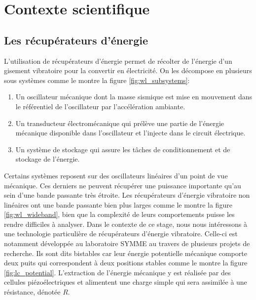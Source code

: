 \documentclass[a4paper, french, 12pt, titlepage]{article}
\begin{document}
\newpage

\section{Contexte scientifique}


\subsection{Les récupérateurs d'énergie}





L'utilisation de récupérateurs d'énergie permet de récolter de l'énergie d'un gisement vibratoire pour la convertir en électricité.
On les décompose en plusieurs sous systèmes comme le montre la figure \ref{fig:wl_subsystems}:
\begin{enumerate}
  \item Un oscillateur mécanique dont la masse sismique est mise en mouvement dans le référentiel de l'oscillateur par l'accélération ambiante.
  \item Un transducteur électromécanique qui prélève une partie de l'énergie mécanique disponible dans l'oscillateur et l'injecte dans le circuit électrique.
  \item Un système de stockage qui assure les tâches de conditionnement et de stockage de l'énergie.
\end{enumerate}

Certains systèmes reposent sur des oscillateurs linéaires d'un point de vue mécanique.
Ces derniers ne peuvent récupérer une puissance importante qu'au sein d'une bande passante très étroite.
Les récupérateurs d'énergie vibratoire non linéaires ont une bande passante bien plus larges comme le montre la figure \ref{fig:wl_wideband}, bien que la complexité de leurs comportements puisse les rendre difficiles à analyser.
Dans le contexte de ce stage, nous nous intéressons à une technologie particulière de récupérateurs d'énergie vibratoire.
Celle-ci est notamment développée au laboratoire SYMME au travers de plusieurs projets de recherche.
Ils sont dits bistables car leur énergie potentielle mécanique comporte deux puits qui correspondent à deux positions stables comme le montre la figure \ref{fig:lc_potential}.
L'extraction de l'énergie mécanique y est réalisée par des cellules piézoélectriques et alimentent une charge simple qui sera assimilée à une résistance, dénotée $R$.
\end{document}
